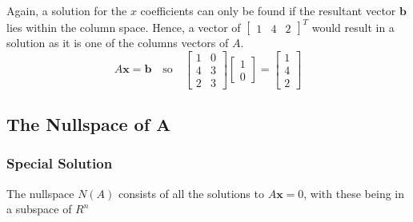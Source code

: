             Again, a solution for the \(x\) coefficients can only be found if the resultant vector \(\boldsymbol{b}\) 
            lies within the column space. Hence, a vector of \(\begin{bmatrix} 1  & 4 & 2 \end{bmatrix}^T\) would 
            result in a solution as it is one of the columns vectors of \(A\).
            \begin{equation}
                A\boldsymbol{x}=\boldsymbol{b} \quad \textrm{so} \quad
                \begin{bmatrix}
                    1 & 0 \\
                    4 & 3 \\
                    2 & 3
                \end{bmatrix}
                \begin{bmatrix}
                    1 \\ 0
                \end{bmatrix}
                =
                \begin{bmatrix}
                    1 \\
                    4 \\
                    2
                \end{bmatrix}
            \end{equation}
    
    \subsection{The Nullspace of \(\boldsymbol{A}\)}
            
        \subsubsection{Special Solution}
            The nullspace \(N(A)\) consists of all the solutions to \(A\boldsymbol{x}=0\), with these being in a 
            subspace of \(R^n\)

